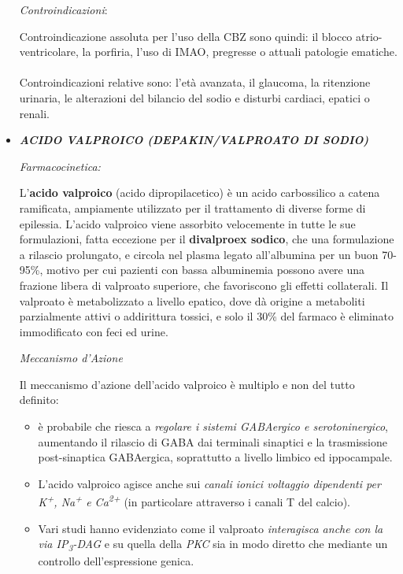 \begin{itemize}
\emph{\emph{Controindicazioni}}:

Controindicazione assoluta per l'uso della CBZ sono quindi: il blocco
atrio-ventricolare, la porfiria, l'uso di IMAO, pregresse o attuali
patologie ematiche.
\\\\
Controindicazioni relative sono: l'età avanzata, il glaucoma, la
ritenzione urinaria, le alterazioni del bilancio del sodio e disturbi
cardiaci, epatici o renali.

\item
  \textbf{\emph{ACIDO VALPROICO (DEPAKIN/VALPROATO DI SODIO)}}

\emph{\emph{Farmacocinetica:}}

L'\textbf{acido valproico} (acido dipropilacetico) è un acido
carbossilico a catena ramificata, ampiamente utilizzato per il
trattamento di diverse forme di epilessia. L'acido valproico viene
assorbito velocemente in tutte le sue formulazioni, fatta eccezione per
il \textbf{divalproex sodico}, che una formulazione a rilascio
prolungato, e circola nel plasma legato all'albumina per un buon
70-95\%, motivo per cui pazienti con bassa albuminemia possono avere una
frazione libera di valproato superiore, che favoriscono gli effetti
collaterali. Il valproato è metabolizzato a livello epatico, dove dà
origine a metaboliti parzialmente attivi o addirittura tossici, e solo
il 30\% del farmaco è eliminato immodificato con feci ed urine.

\emph{\emph{Meccanismo d'Azione}}

Il meccanismo d'azione dell'acido valproico è multiplo e non del tutto
definito:

\begin{itemize}
\item
  è probabile che riesca a \emph{regolare i sistemi GABAergico e
  serotoninergico}, aumentando il rilascio di GABA dai terminali
  sinaptici e la trasmissione post-sinaptica GABAergica, soprattutto a
  livello limbico ed ippocampale.
\item
  L'acido valproico agisce anche sui \emph{canali ionici voltaggio
  dipendenti per K\textsuperscript{+}, Na\textsuperscript{+} e
  Ca\textsuperscript{2+}} (in particolare attraverso i canali T del
  calcio).
\item
  Vari studi hanno evidenziato come il valproato \emph{interagisca anche
  con la via IP\textsubscript{3}-DAG} e su quella della \emph{PKC} sia
  in modo diretto che mediante un controllo dell'espressione genica.
\end{itemize}


\end{itemize}
